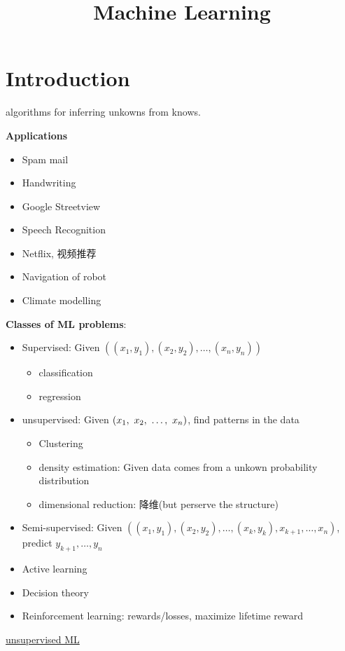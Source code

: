 \documentclass{article}
\begin{document}
\title{Machine Learning}
\author{}
\maketitle
\tableofcontents
\newpage
\section{Introduction}
algorithms for inferring unkowns from knows.

\textbf{Applications}
\begin{itemize}
\item Spam mail
\item Handwriting
\item Google Streetview
\item Speech Recognition
\item Netflix, 视频推荐
\item Navigation of robot
\item Climate modelling
\end{itemize}

\textbf{Classes of ML problems}:
\begin{itemize}
\item Supervised: Given $((x_1, y_1), (x_2, y_2), \ldots, (x_n, y_n))$
	\begin{itemize}
	\item classification
	\item regression
	\end{itemize}
\item unsupervised: Given $(x_1,~x_2,~\ldots,~x_n)$, find patterns in the data
	\begin{itemize}
	\item Clustering
	\item density estimation: Given data comes from a unkown probability distribution
	\item dimensional reduction: 降维(but perserve the structure)
	\end{itemize}
\item Semi-supervised: Given $((x_1, y_1), (x_2, y_2), \ldots, (x_k, y_k), x_{k+1}, \ldots, x_n)$, predict $y_{k+1}, \ldots, y_n$
\item Active learning
\item Decision theory
\item Reinforcement learning: rewards/losses, maximize lifetime reward
\end{itemize}
\href{http://i.imgbox.com/sVuBzaqV.png}{unsupervised ML}
\end{document}
